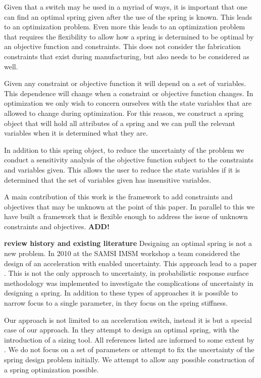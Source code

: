 \documentclass[10pt]{article}
\begin{document}
Given that a switch may be used in a myriad of ways, it is important that one can find an optimal spring given after the use of the spring is known. This leads to an optimization problem. Even more this leads to an optimization problem that requires the flexibility to allow how a spring is determined to be optimal by an objective function and constraints. This does not consider the fabrication constraints that exist during manufacturing, but also needs to be considered as well. 

Given any constraint or objective function it will depend on a set of variables. This dependence will change when a constraint or objective function changes. In optimization we only wish to concern ourselves with the state variables that are allowed to change during optimization. For this reason, we construct a spring object that will hold all attributes of a spring and we can pull the relevant variables when it is determined what they are. 

In addition to this spring object, to reduce the uncertainty of the problem we conduct a sensitivity analysis of the objective function subject to the constraints and variables given. This allows the user to reduce the state variables if it is determined that the set of variables given has insensitive variables. 

A main contribution of this work is the framework to add constraints and objectives that may be unknown at the point of this paper. In parallel to this we have built a framework that is flexible enough to address the issue of unknown constraints and objectives. \textbf{ADD!}


\textbf{review history and existing literature}
Designing an optimal spring is not a new problem. In 2010 at the SAMSI IMSM workshop a team considered the design of an acceleration with enabled uncertainty. This approach lead to a paper \cite{IMSM2010}. This is not the only approach to uncertainty, in \cite{Reliability} probabilistic response surface methodology was implemented to investigate the complications of uncertainty in designing a spring. In addition to these types of approaches it is possible to narrow focus to a single parameter, in \cite{Robust} they focus on the spring stiffness. 

Our approach is not limited to an acceleration switch, instead it is but a special case of our approach. In \cite{Paredes} they attempt to design an optimal spring, with the introduction of a sizing tool. All references listed are informed to some extent by \cite{Wahl}. We do not focus on a set of parameters or attempt to fix the uncertainty of the spring design problem initially. We attempt to allow any possible construction of a spring optimization possible. 
\end{document}
